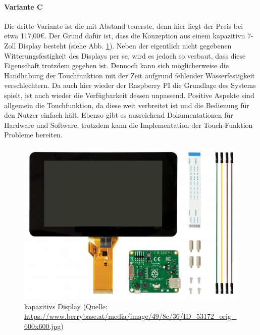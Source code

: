 \paragraph{Variante C}
Die dritte Variante ist die mit Abstand teuerste, denn hier liegt der Preis bei etwa 117,00€. Der Grund dafür ist, dass die Konzeption aus einem \gls{kapazitiv}n 7-Zoll Display besteht (siehe Abb. \ref{fig:kapazitives_display}). Neben der eigentlich nicht gegebenen Witterungsfestigkeit des Displays per se, wird es jedoch so verbaut, dass diese Eigenschaft trotzdem gegeben ist. Dennoch kann sich möglicherweise die Handhabung der Touchfunktion mit der Zeit aufgrund fehlender Wasserfestigkeit verschlechtern. Da auch hier wieder der Raspberry PI die Grundlage des Systems spielt, ist auch wieder die Verfügbarkeit dessen unpassend. Positive Aspekte sind allgemein die Touchfunktion, da diese weit verbreitet ist und die Bedienung für den Nutzer einfach hält. Ebenso gibt es ausreichend Dokumentationen für Hardware und Software, trotzdem kann die Implementation der Touch-Funktion Probleme bereiten.
\begin{figure}[ht]
	\centering
	\includegraphics[width=0.6\linewidth]{Bilder/kapazitives_display.jpg}
	\caption[\gls{kapazitiv}s Display (Quelle: \url{https://www.berrybase.at/media/image/49/8e/36/ID_53172_orig_600x600.jpg}, Zugriff am 19.02.2024]{\gls{kapazitiv}s Display (Quelle: \url{https://www.berrybase.at/media/image/49/8e/36/ID_53172_orig_600x600.jpg})}
	\label{fig:kapazitives_display}
\end{figure}
\newpage
